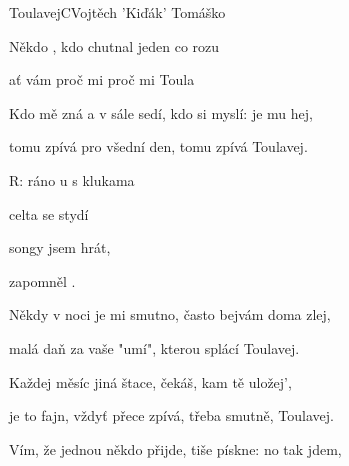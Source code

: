 \begin{song}{Toulavej}{C}{Vojtěch 'Kiďák' Tomáško}

\begin{SBVerse}

Někdo , kdo chutnal  jeden  co rozu

ať vám  proč mi  proč mi  Toula

\end{SBVerse}

\begin{SBVerse}

Kdo mě zná a v sále sedí, kdo si myslí: je mu hej,

tomu zpívá pro všední den, tomu zpívá Toulavej.

\end{SBVerse}

\begin{SBChorus}

R:  ráno  u  s klukama 

 celta se  stydí

 songy jsem  hrát,

zapomněl .

\end{SBChorus}

\begin{SBVerse}

Někdy v noci je mi smutno, často bejvám doma zlej,

malá daň za vaše "umí", kterou splácí Toulavej.

\end{SBVerse}

\begin{SBVerse}

Každej měsíc jiná štace, čekáš, kam tě uložej',

je to fajn, vždyť přece zpívá, třeba smutně, Toulavej.

\end{SBVerse}

\begin{SBChorus}

\end{SBChorus}

\begin{SBVerse}

Vím, že jednou někdo přijde, tiše pískne: no tak jdem,


\end{SBVerse}
\end{song}
